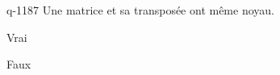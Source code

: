 \begin{truefalse}{q-1187}
Une matrice et sa transposée ont même noyau.
\item Vrai
\item* Faux
\end{truefalse}

